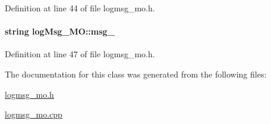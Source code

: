 Definition at line 44 of file logmsg\_\-mo.h.\hypertarget{classlogMsg__MO_logMsg__MOo1}{
\paragraph[msg\_\-]{\setlength{\rightskip}{0pt plus 5cm}string log\-Msg\_\-MO::msg\_\-}\hfill}
\label{classlogMsg__MO_logMsg__MOo1}




Definition at line 47 of file logmsg\_\-mo.h.

The documentation for this class was generated from the following files:\begin{CompactItemize}
\item 
\hyperlink{logmsg__mo_8h}{logmsg\_\-mo.h}\item 
\hyperlink{logmsg__mo_8cpp}{logmsg\_\-mo.cpp}\end{CompactItemize}
